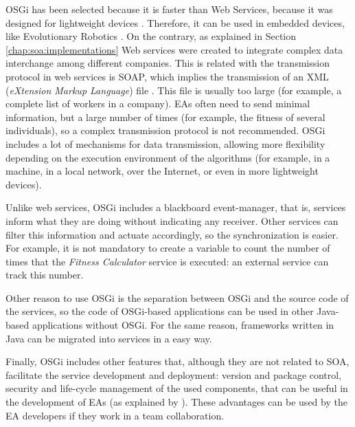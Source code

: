 OSGi has been selected because it is faster than Web Services, because it was designed for 
  lightweight devices \cite{LimGateway08}. Therefore, it can be
  used in embedded devices, like Evolutionary Robotics
  \cite{Garcia2012testing}. On the contrary, as explained in Section \ref{chap:soa:implementations} Web services were created to integrate complex
  data interchange among different companies. This is related with the transmission protocol in web services is SOAP, which implies
  the transmission of an XML ({\em eXtension Markup
    Language}) file \cite{XML}. This file is usually too large (for example, a
  complete list of workers in a company). EAs often need to send
  minimal information, but a large number of times (for example, the
  fitness of several individuals), so a complex transmission protocol
  is not recommended. OSGi includes a lot of mechanisms for data
  transmission, allowing more flexibility depending on the execution environment of
  the algorithms (for example, in a machine, in a local
  network, over the Internet, or even in more lightweight devices). 

Unlike web services, OSGi includes a blackboard event-manager,
   that is, services inform what they are doing without indicating 
 any receiver. Other services can filter this information and actuate
 accordingly, so the synchronization is easier. For example, it is not
 mandatory to create a variable to count the number of times that the
 {\em Fitness Calculator} service is executed: an external service can
 track this number. 

Other reason to use OSGi is the separation between OSGi and the source code of the
   services, so the code of OSGi-based applications can be used in other
   Java-based applications without OSGi. For the same reason,
   frameworks written in Java can be migrated into services in a easy
   way.

Finally, OSGi includes other features that, although they are not related to SOA, facilitate the service development and deployment: version and package
   control, security and life-cycle management of the used
   components, that can be useful in the development of EAs 
   (as explained by  \cite{WagnerPlugins07}). These advantages can be used by the EA developers if
   they work in a team collaboration. %

